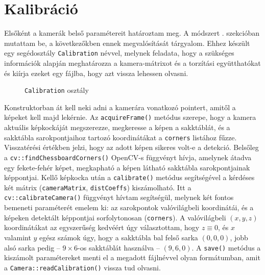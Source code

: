 \section{Kalibráció}

Elsőként a kamerák belső paramétereit határoztam meg. A módszert . szekcióban mutattam be, a következőkben ennek megvalósítását tárgyalom. Ehhez készült egy segédosztály \texttt{Calibration} névvel, melynek feladata, hogy a szükséges információk alapján meghatározza a kamera-mátrixot és a torzítási együtthatókat és kiírja ezeket egy fájlba, hogy azt vissza lehessen olvasni.

\begin{figure}[tbh]
\centering


\caption{\texttt{Calibration} osztály \label{fig:cd:calibration}}
\end{figure}

Konstruktorban át kell neki adni a kamerára vonatkozó pointert, amitől a képeket kell majd lekérnie. Az \texttt{acquireFrame()} metódus szerepe, hogy a kamera aktuális képkockáját megszerezze, megkeresse a képen a sakktáblát, és a sakktábla sarokpontjaihoz tartozó koordinátákat a \texttt{corners} listához fűzze. Visszatérési értékben jelzi, hogy az adott képen sikeres volt-e a detekció. Belsőleg a \texttt{cv::findChessboardCorners()} OpenCV-s függvényt hívja, amelynek átadva egy fekete-fehér képet, megkapható a képen látható sakktábla sarokpontjainak képpontjai. Kellő képkocka után a \texttt{calibrate()} metódus segítségével a kérdéses két mátrix (\texttt{cameraMatrix}, \texttt{distCoeffs}) kiszámolható. Itt a \texttt{cv::calibrateCamera()} függvényt hívtam segítségül, melynek két fontos bemeneti paraméterét emelem ki: az sarokpontok valóvilágbeli koordinátái, és a képeken detektált képpontjai sorfolytonosan (\texttt{corners}). A valóvilágbeli $(x, y, z)$ koordinátákat az egyszerűség kedvéért úgy választottam, hogy $z \equiv 0$, és $x$ valamint $y$ egész számok úgy, hogy a sakktábla bal felső sarka $(0, 0, 0)$, jobb alsó sarka pedig -- $9\times 6$-os sakktáblát használva -- $(9, 6, 0)$. A \texttt{save()} metódus a kiszámolt paramétereket menti el a megadott fájlnévvel olyan formátumban, amit a \texttt{Camera::readCalibration()} vissza tud olvasni.


